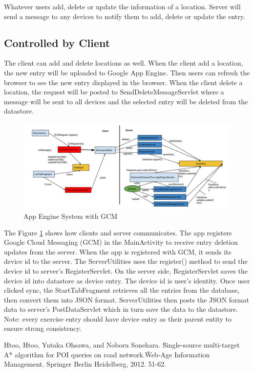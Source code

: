 \documentclass{article}
\begin{document}
Whatever users add, delete or update the information of a location. Server will send a message to any devices to notify them to add, delete or update the entry.

\subsection{Controlled by Client}
The client can add and delete locations as well. When the client add a location, the new entry will be uploaded to Google App Engine. Then users can refresh the browser to see the new entry displayed in the browser. When the client delete a location, the request will be posted to SendDeleteMessageServlet where a message will be sent to all devices and the selected entry will be deleted from the datastore.

\begin{figure}[h!]   
\centering
\includegraphics[width = \textwidth]{figures/AppEngineSystem.jpg}
\caption{App Engine System with GCM}
\label{F:appenginesys}
\end{figure}

The Figure \ref{F:appenginesys} shows how clients and server communicates. The app registers Google Cloud Messaging (GCM) in the MainActivity to receive entry deletion updates from the server. When the app is registered with GCM, it sends its device id to the server. The ServerUtilities uses the register() method to send the device id to server’s RegisterServlet. On the server side, RegisterServlet saves the device id into datastore as device entry. The device id is user’s identity. Once user clicked sync, the StartTabFragment retrieves all the entries from the database, then convert them into JSON format. ServerUtilities then posts the JSON format data to server’s PostDataServlet which in turn save the data to the datastore. Note: every exercise entry should have device entry as their parent entity to ensure strong consistency.


\begin{thebibliography}{99}
  Htoo, Htoo, Yutaka Ohsawa, and Noboru Sonehara. \"Single-source multi-target A* algorithm for POI queries on road network.\" Web-Age Information Management. Springer Berlin Heidelberg, 2012. 51-62.


\end{thebibliography}
\end{document}
